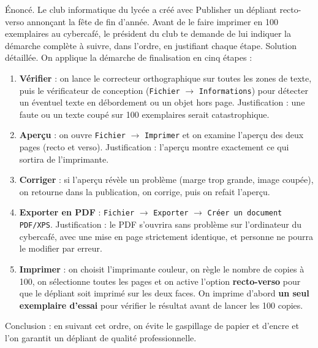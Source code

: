 \documentclass[11pt]{article}
\begin{document}
\begin{exoresolu}
Énoncé. Le club informatique du lycée a créé avec Publisher un dépliant recto-verso annonçant la fête de fin d'année. Avant de le faire imprimer en 100 exemplaires au cybercafé, le président du club te demande de lui indiquer la démarche complète à suivre, dans l'ordre, en justifiant chaque étape.
\tcblower
Solution détaillée. On applique la démarche de finalisation en cinq étapes :
\begin{enumerate}
\item \textbf{Vérifier} : on lance le correcteur orthographique sur toutes les zones de texte, puis le vérificateur de conception (\texttt{Fichier} $\rightarrow$ \texttt{Informations}) pour détecter un éventuel texte en débordement ou un objet hors page. Justification : une faute ou un texte coupé sur 100 exemplaires serait catastrophique.
\item \textbf{Aperçu} : on ouvre \texttt{Fichier} $\rightarrow$ \texttt{Imprimer} et on examine l'aperçu des deux pages (recto et verso). Justification : l'aperçu montre exactement ce qui sortira de l'imprimante.
\item \textbf{Corriger} : si l'aperçu révèle un problème (marge trop grande, image coupée), on retourne dans la publication, on corrige, puis on refait l'aperçu.
\item \textbf{Exporter en PDF} : \texttt{Fichier} $\rightarrow$ \texttt{Exporter} $\rightarrow$ \texttt{Créer un document PDF/XPS}. Justification : le PDF s'ouvrira sans problème sur l'ordinateur du cybercafé, avec une mise en page strictement identique, et personne ne pourra le modifier par erreur.
\item \textbf{Imprimer} : on choisit l'imprimante couleur, on règle le nombre de copies à 100, on sélectionne toutes les pages et on active l'option \textbf{recto-verso} pour que le dépliant soit imprimé sur les deux faces. On imprime d'abord \textbf{un seul exemplaire d'essai} pour vérifier le résultat avant de lancer les 100 copies.
\end{enumerate}
Conclusion : en suivant cet ordre, on évite le gaspillage de papier et d'encre et l'on garantit un dépliant de qualité professionnelle.
\end{exoresolu}
\end{document}
